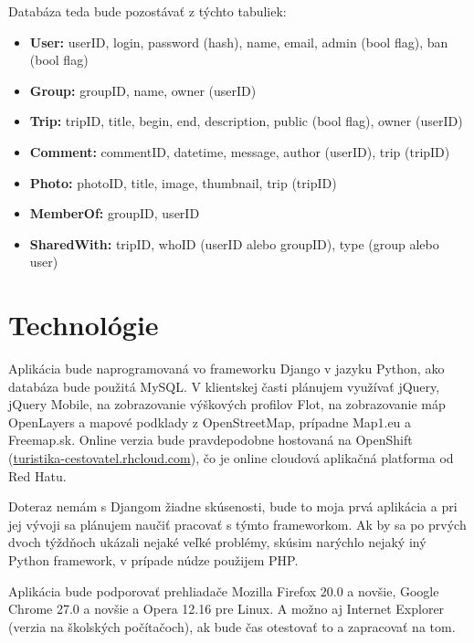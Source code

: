 \documentclass[12pt,a4paper]{scrartcl}
\begin{document}
Databáza teda bude pozostávať z týchto tabuliek:
\begin{itemize}
	\item{\bf User:} userID, login, password (hash), name, email, admin (bool flag), ban (bool flag)
	\item{\bf Group:} groupID, name, owner (userID)
	\item{\bf Trip:} tripID, title, begin, end, description, public (bool flag), owner (userID)
	\item{\bf Comment:} commentID, datetime, message, author (userID), trip (tripID)
	\item{\bf Photo:} photoID, title, image, thumbnail, trip (tripID)
	\item{\bf MemberOf:} groupID, userID
	\item{\bf SharedWith:} tripID, whoID (userID alebo groupID), type (group alebo user)
\end{itemize}

\section{Technológie}
Aplikácia bude naprogramovaná vo frameworku Django v jazyku Python, ako databáza bude použitá MySQL. V klientskej časti plánujem využívať jQuery, jQuery Mobile, na zobrazovanie výškových profilov Flot, na zobrazovanie máp OpenLayers a mapové podklady z OpenStreetMap, prípadne Map1.eu a Freemap.sk.
Online verzia bude pravdepodobne hostovaná na OpenShift (\href{http://turistika-cestovatel.rhcloud.com}{turistika-cestovatel.rhcloud.com}), čo je online cloudová aplikačná platforma od Red Hatu.

Doteraz nemám s Djangom žiadne skúsenosti, bude to moja prvá aplikácia a pri jej vývoji sa plánujem naučiť pracovať s týmto frameworkom. Ak by sa po prvých dvoch týždňoch ukázali nejaké veľké problémy, skúsim narýchlo nejaký iný Python framework, v prípade núdze použijem PHP.

Aplikácia bude podporovať prehliadače Mozilla Firefox 20.0 a novšie, Google Chrome 27.0 a novšie a Opera 12.16 pre Linux. A možno aj Internet Explorer (verzia na školských počítačoch), ak bude čas otestovať to a zapracovať na tom.
\end{document}
